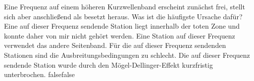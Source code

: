     {Eine Frequenz auf einem höheren Kurzwellenband erscheint zunächst frei, stellt sich aber anschließend als besetzt heraus. Was ist die häufigste Ursache dafür?}
    {Eine auf dieser Frequenz sendende Station liegt innerhalb der toten Zone und konnte daher von mir nicht gehört werden.}
    {Eine Station auf dieser Frequenz verwendet das andere Seitenband.}
    {Für die auf dieser Frequenz sendenden Stationen sind die Ausbreitungsbedingungen zu schlecht.}
    {Die auf dieser Frequenz sendende Station wurde durch den Mögel-Dellinger-Effekt kurzfristig unterbrochen.}
    {false}{false}